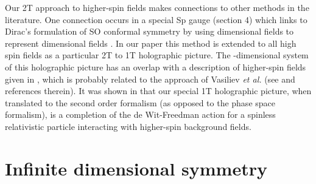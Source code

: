 \documentclass[a4paper,12pt]{article}
\begin{document}
Our 2T approach to higher-spin fields makes connections to other methods in
the literature. One connection occurs in a special Sp\myHighlight{$\left( 2\right) $}\coordHE{}
gauge (section 4) which links to Dirac's formulation of SO\coordHE{} conformal symmetry by using \coordHE{} dimensional fields to represent \coordHE{}
dimensional fields \cite{dirac}. In our paper this method is extended to all
high spin fields as a particular 2T to 1T holographic picture. The \coordHE{}%
-dimensional system of this holographic picture has an overlap with a
description of higher-spin fields given in \cite{segal}, which is probably
related to the approach of Vasiliev \textit{et al.} (see \cite{vasiliev} and
references therein). It was shown in \cite{segal} that our special 1T
holographic picture, when translated to the second order formalism (as
opposed to the phase space formalism), is a completion of the de
Wit-Freedman action \cite{dwitf} for a spinless relativistic particle
interacting with higher-spin background fields.

\section{Infinite dimensional symmetry}
\end{document}
